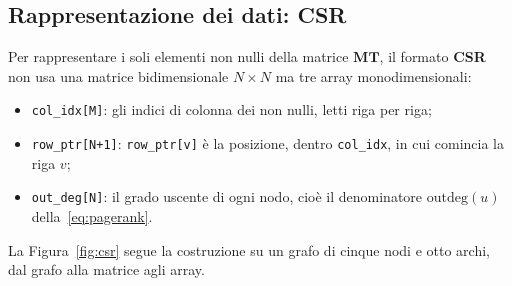 \documentclass[11pt,a4paper]{article}
\begin{document}
\subsection{Rappresentazione dei dati: CSR}
\label{sec:csr}

Per rappresentare i soli elementi non nulli della matrice $\mathbf{MT}$, il
formato \textbf{CSR} non usa una matrice bidimensionale $N \times N$ ma tre
array monodimensionali:
\begin{itemize}
  \item \texttt{col\_idx[M]}: gli indici di colonna dei non nulli, letti riga
    per riga;
  \item \texttt{row\_ptr[N+1]}: \texttt{row\_ptr[v]} è la posizione, dentro
    \texttt{col\_idx}, in cui comincia la riga $v$;
  \item \texttt{out\_deg[N]}: il grado uscente di ogni nodo, cioè il
    denominatore $\mathrm{outdeg}(u)$ della~\eqref{eq:pagerank}.
\end{itemize}
La Figura~\ref{fig:csr} segue la costruzione su un grafo di cinque nodi e otto
archi, dal grafo alla matrice agli array.
\end{document}
